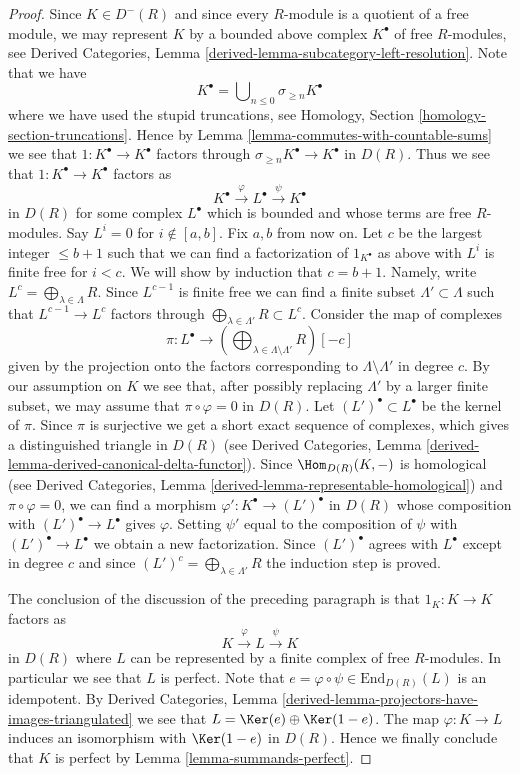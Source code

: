 \begin{proof}
\medskip\noindent
Since $K \in D^{-}(R)$ and since every $R$-module is a quotient of a free
module, we may represent $K$ by a bounded above complex $K^\bullet$
of free $R$-modules, see
Derived Categories, Lemma \ref{derived-lemma-subcategory-left-resolution}.
Note that we have
$$
K^\bullet = \bigcup\nolimits_{n \leq 0} \sigma_{\geq n}K^\bullet
$$
where we have used the stupid truncations, see
Homology, Section \ref{homology-section-truncations}.
Hence by Lemma \ref{lemma-commutes-with-countable-sums} we see that
$1 : K^\bullet \to K^\bullet$ factors through
$\sigma_{\geq n}K^\bullet \to K^\bullet$ in $D(R)$.
Thus we see that $1 : K^\bullet \to K^\bullet$ factors as
$$
K^\bullet \xrightarrow{\varphi} L^\bullet \xrightarrow{\psi} K^\bullet
$$
in $D(R)$ for some complex $L^\bullet$ which is bounded and whose terms
are free $R$-modules. Say $L^i = 0$ for $i \not \in [a, b]$.
Fix $a, b$ from now on. Let $c$ be the largest integer $\leq b + 1$
such that we can find a factorization of $1_{K^\bullet}$ as above
with $L^i$ is finite free for $i < c$. We will show by induction that
$c = b + 1$. Namely, write $L^c = \bigoplus_{\lambda \in \Lambda} R$.
Since $L^{c - 1}$ is finite free we can find a finite subset
$\Lambda' \subset \Lambda$ such that $L^{c - 1} \to L^c$ factors
through $\bigoplus_{\lambda \in \Lambda'} R \subset L^c$. Consider the
map of complexes
$$
\pi :
L^\bullet
\longrightarrow
(\bigoplus\nolimits_{\lambda \in \Lambda \setminus \Lambda'} R)[-c]
$$
given by the projection onto the factors corresponding to
$\Lambda \setminus \Lambda'$ in degree $c$.
By our assumption on $K$ we see that, after possibly replacing $\Lambda'$ by
a larger finite subset, we may assume that $\pi \circ \varphi = 0$
in $D(R)$. Let $(L')^\bullet \subset L^\bullet$ be the kernel of $\pi$.
Since $\pi$ is surjective we get a short exact sequence of complexes,
which gives a distinguished triangle in $D(R)$ (see
Derived Categories, Lemma \ref{derived-lemma-derived-canonical-delta-functor}).
Since $\Hom_{D(R)}(K, -)$ is homological (see
Derived Categories, Lemma \ref{derived-lemma-representable-homological})
and $\pi \circ \varphi = 0$, we can find a morphism
$\varphi' : K^\bullet \to (L')^\bullet$ in $D(R)$ whose
composition with $(L')^\bullet \to L^\bullet$ gives $\varphi$.
Setting $\psi'$ equal to the composition of $\psi$ with
$(L')^\bullet \to L^\bullet$ we obtain a new factorization.
Since $(L')^\bullet$ agrees with $L^\bullet$ except in degree $c$
and since $(L')^c = \bigoplus_{\lambda \in \Lambda'} R$ the
induction step is proved.

\medskip\noindent
The conclusion of the discussion of the preceding paragraph is that
$1_K : K \to K$ factors as
$$
K \xrightarrow{\varphi} L \xrightarrow{\psi} K
$$
in $D(R)$ where $L$ can be represented by a finite
complex of free $R$-modules. In particular we see that $L$ is
perfect. Note that $e = \varphi \circ \psi \in \text{End}_{D(R)}(L)$
is an idempotent. By Derived Categories,
Lemma \ref{derived-lemma-projectors-have-images-triangulated}
we see that $L = \Ker(e) \oplus \Ker(1 - e)$.
The map $\varphi : K \to L$ induces an isomorphism with
$\Ker(1 - e)$ in $D(R)$. Hence we finally conclude that
$K$ is perfect by Lemma \ref{lemma-summands-perfect}.
\end{proof}


